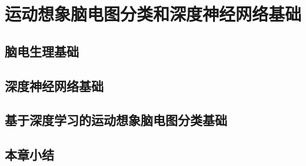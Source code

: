 
\chapter{运动想象脑电图分类和深度神经网络基础}

\section{脑电生理基础}

\section{深度神经网络基础}

\section{基于深度学习的运动想象脑电图分类基础}

\section{本章小结}
